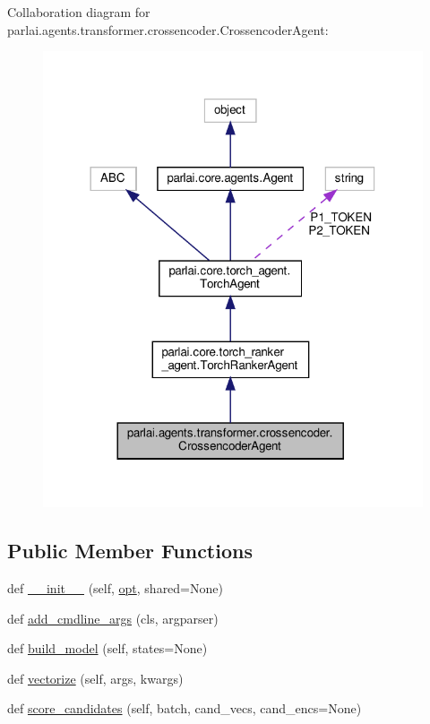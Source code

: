 Collaboration diagram for parlai.\+agents.\+transformer.\+crossencoder.\+Crossencoder\+Agent\+:
\nopagebreak
\begin{figure}[H]
\begin{center}
\leavevmode
\includegraphics[width=318pt]{da/db5/classparlai_1_1agents_1_1transformer_1_1crossencoder_1_1CrossencoderAgent__coll__graph}
\end{center}
\end{figure}
\subsection*{Public Member Functions}
\begin{DoxyCompactItemize}
\item 
def \hyperlink{classparlai_1_1agents_1_1transformer_1_1crossencoder_1_1CrossencoderAgent_a22295a739ff290d96c45efd0bfd550bb}{\+\_\+\+\_\+init\+\_\+\+\_\+} (self, \hyperlink{classparlai_1_1core_1_1torch__agent_1_1TorchAgent_a785bb920cf8c8afc3e9bf6a8b77e335a}{opt}, shared=None)
\item 
def \hyperlink{classparlai_1_1agents_1_1transformer_1_1crossencoder_1_1CrossencoderAgent_a931cdceebd1eceb9c20638271c86af7a}{add\+\_\+cmdline\+\_\+args} (cls, argparser)
\item 
def \hyperlink{classparlai_1_1agents_1_1transformer_1_1crossencoder_1_1CrossencoderAgent_af63326f1f4d295e7a1a7fad4b07e077d}{build\+\_\+model} (self, states=None)
\item 
def \hyperlink{classparlai_1_1agents_1_1transformer_1_1crossencoder_1_1CrossencoderAgent_a736057f000f0d4cdb5d006e10c4291db}{vectorize} (self, args, kwargs)
\item 
def \hyperlink{classparlai_1_1agents_1_1transformer_1_1crossencoder_1_1CrossencoderAgent_a5c286ce0bc163e443e73182f95d6e0c6}{score\+\_\+candidates} (self, batch, cand\+\_\+vecs, cand\+\_\+encs=None)
\end{DoxyCompactItemize}
